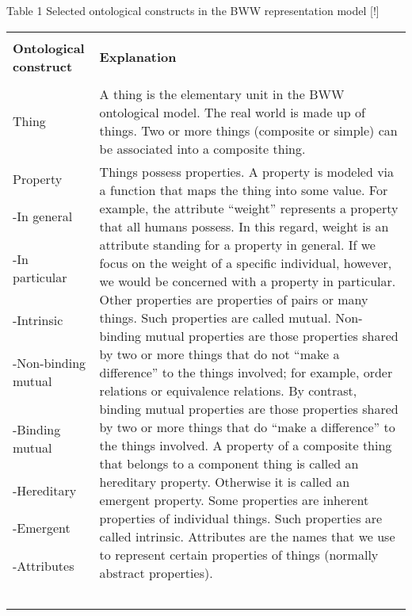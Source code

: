 \documentclass[parskip=full]{uvamscse}
\begin{document}
Table 1
Selected ontological constructs in the BWW representation model [!]
\begin{center}
\begin{longtable}{ | p{11em} | p{30em} | } 
\hline
 &  \\
\textbf{Ontological construct} & \textbf{Explanation} \\
 &  \\
\hline
Thing & A thing is the elementary unit in the BWW ontological model. The real world is made up of things. Two or more things (composite or simple) can be associated into a composite thing. \\ 
\hline
Property & \multirow{9}{30em}{Things possess properties. A property is modeled via a function that maps the thing into some value. For example, the attribute ``weight'' represents a property that all humans possess. In this regard, weight is an attribute standing for a property in general. If we focus on the weight of a specific individual, however, we would be concerned with a property in particular. Other properties are properties of pairs or many things. Such properties are called mutual. Non-binding mutual properties are those properties shared by two or more things that do not ``make a difference'' to the things involved; for example, order relations or equivalence relations. By contrast, binding mutual properties are those properties shared by two or more things that do ``make a difference'' to the things involved. A property of a composite thing that belongs to a component thing is called an hereditary property. Otherwise it is called an emergent property. Some properties are inherent properties of individual things. Such properties are called intrinsic. Attributes are the names that we use to represent certain properties of things (normally abstract properties).} \\ 
-In general &  \\
-In particular &  \\
-Intrinsic &  \\
-Non-binding mutual &  \\
-Binding mutual &  \\
-Hereditary &  \\
-Emergent &  \\
-Attributes &  \\
 &  \\ 
 &  \\
 &  \\
 &  \\
 &  \\

\end{longtable}
\end{center}
\end{document}

